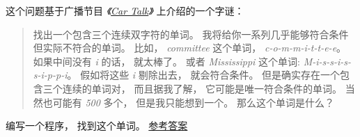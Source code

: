 \begin{exercise}
    


这个问题基于广播节目 {\em 《\href{http://www.cartalk.com/content/puzzlers}{Car Talk}》} 上介绍的一个字谜：


\begin{quote}
    找出一个包含三个连续双字符的单词。  我将给你一系列几乎能够符合条件但实际不符合的单词。
    比如， {\em committee} 这个单词， {\em c-o-m-m-i-t-t-e-e}。
    如果中间没有 {\em i} 的话， 就太棒了。
    或者 {\em Mississippi} 这个单词: {\em M-i-s-s-i-s-s-i-p-p-i}。
    假如将这些 {\em i} 剔除出去， 就会符合条件。
    但是确实存在一个包含三个连续的单词对， 而且据我了解， 它可能是唯一符合条件的单词。
    当然也可能有 {\em 500} 多个， 但是我只能想到一个。
    那么这个单词是什么？
\end{quote}


编写一个程序， 找到这个单词。
\href{http://thinkpython2.com/code/cartalk1.py}{参考答案}

\end{exercise}


